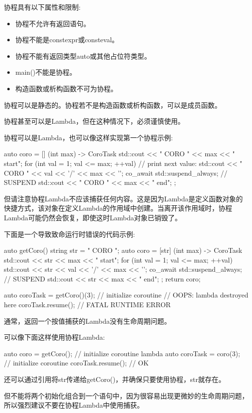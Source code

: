 
协程具有以下属性和限制:

\begin{itemize}
\item
协程不允许有返回语句。

\item
协程不能是constexpr或consteval。

\item
协程不能有返回类型auto或其他占位符类型。

\item
main()不能是协程。

\item
构造函数或析构函数不可为协程。
\end{itemize}

协程可以是静态的。协程若不是构造函数或析构函数，可以是成员函数。

协程甚至可以是Lambda，但在这种情况下，必须谨慎使用。


协程可以是Lambda，也可以像这样实现第一个协程示例:

\begin{cpp}
auto coro = [] (int max) -> CoroTask {
				std::cout << "          CORO " << max << " start\n";
				for (int val = 1; val <= max; ++val) {
					// print next value:
					std::cout << " CORO " << val << '/' << max << '\n';
					co_await std::suspend_always{}; // SUSPEND
				}
				std::cout << "         CORO " << max << " end\n";
};
\end{cpp}

但请注意协程Lambda不应该捕获任何内容。这是因为Lambda是定义函数对象的快捷方式，该对象在定义Lambda的作用域中创建。当离开该作用域时，协程Lambda可能仍然会恢复，即使这时Lambda对象已销毁了。

下面是一个导致致命运行时错误的代码示例:

\begin{cpp}
auto getCoro()
{
	string str = "      CORO ";
	auto coro = [str] (int max) -> CoroTask {
				std::cout << str << max << " start\n";
				for (int val = 1; val <= max; ++val) {
					std::cout << str << val << '/' << max << '\n';
					co_await std::suspend_always{}; // SUSPEND
				}
				std::cout << str << max << " end\n";
			};
	return coro;
}

auto coroTask = getCoro()(3); // initialize coroutine
// OOPS: lambda destroyed here
coroTask.resume(); // FATAL RUNTIME ERROR
\end{cpp}

通常，返回一个按值捕获的Lambda没有生命周期问题。

可以像下面这样使用协程Lambda:

\begin{cpp}
auto coro = getCoro(); // initialize coroutine lambda
auto coroTask = coro(3); // initialize coroutine
coroTask.resume(); // OK
\end{cpp}

还可以通过引用将str传递给getCoro()，并确保只要使用协程，str就存在。

但不能将两个初始化组合到一个语句中，因为很容易出现更微妙的生命周期问题，所以强烈建议不要在协程Lambda中使用捕获。

